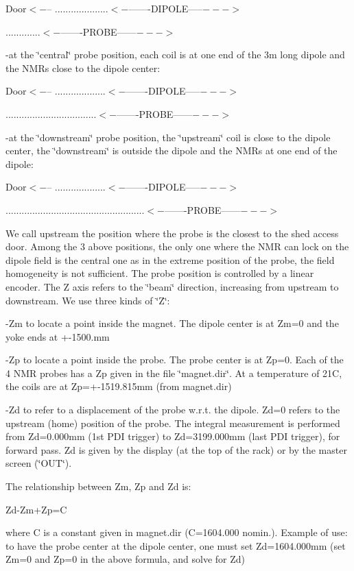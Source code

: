 Door$<-$-- ....................$<-$-------DIPOLE-----$--->$ 

.............$<-$-------PROBE------$--->$ 

-at the \char`\"{}central\char`\"{} probe position, each coil is at one end
of the 3m long dipole and the NMRs close to the dipole center: 

Door$<-$-- ...................$<-$-------DIPOLE-----$--->$ 

..................................$<-$-------PROBE------$--->$ 

-at the \char`\"{}downstream\char`\"{} probe position, the \char`\"{}upstream\char`\"{}
coil is close to the dipole center, the \char`\"{}downstream\char`\"{} is outside
the dipole and the NMRs at one end of the dipole: 

Door$<-$-- ...................$<-$-------DIPOLE-----$--->$ 

....................................................$<-$-------PROBE------$--->$ 

We call upstream the position where the probe is the closest to the shed access
door. Among the 3 above positions, the only one where the NMR can lock on the dipole
field is the central one as in the extreme position of the probe, the field homogeneity
is not sufficient. The probe position is controlled by a linear encoder. The
Z axis refers to the \char`\"{}beam\char`\"{} direction, increasing from upstream
to downstream. We use three kinds of \char`\"{}Z\char`\"{}: 

-Zm to locate a point inside the magnet. The dipole center is at Zm=0 and the
yoke ends at +-1500.mm 

-Zp to locate a point inside the probe. The probe center is at Zp=0. Each of
the 4 NMR probes has a Zp given in the file \char`\"{}magnet.dir\char`\"{}.
At a temperature of 21C, the coils are at Zp=+-1519.815mm (from magnet.dir) 

-Zd to refer to a displacement of the probe w.r.t. the dipole. Zd=0 refers to
the upstream (home) position of the probe. The integral measurement is performed
from Zd=0.000mm (1st PDI trigger) to Zd=3199.000mm (last PDI trigger), for forward
pass. Zd is given by the display (at the top of the rack) or by the master screen
(\char`\"{}OUT\char`\"{}). 

The relationship between Zm, Zp and Zd is: 

Zd-Zm+Zp=C 

where C is a constant given in magnet.dir (C=1604.000 nomin.). Example of use:
to have the probe center at the dipole center, one must set Zd=1604.000mm (set
Zm=0 and Zp=0 in the above formula, and solve for Zd) 

